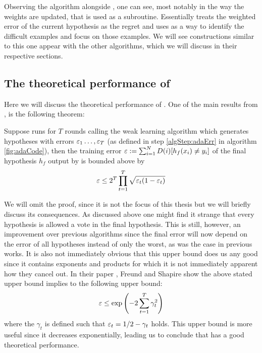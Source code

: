 Observing the \hedge\cite{Freund1997} algorithm alongside \adaB, one can see, most notably in the way the weights are updated, that \hedge is used as a subroutine. Essentially \adaB treats the weighted error of the current hypothesis as the regret and uses \hedge as a way to identify the difficult examples and focus \weak on those examples. We will see constructions similar to this one appear with the other algorithms, which we will discuss in their respective sections.
\subsection{The theoretical performance of \adaB}

\label{subsec:AdaTheoPerf}
Here we will discuss the theoretical performance of \adaB. One of the main results from \cite{Freund1997}, is the following theorem: 
\begin{theorem}\label{thm:adaErr}\cite{Freund1997}
Suppose \adaB runs for $T$ rounds calling the weak learning algorithm \weak which generates hypotheses with errors $\varepsilon_1\ldots, \varepsilon_T$ (as defined in step \ref{algStep:adaErr} in algorithm \ref{fig:adaCode}), then the training error $\varepsilon:=\sum_{i=1}^ND(i)[h_f(x_i)\neq y_i]$ of the final hypothesis $h_f$ output by \adaB is bounded above by $$\varepsilon\leq 2^T\prod^T_{t=1}\sqrt{\varepsilon_t(1-\varepsilon_t)}$$
\end{theorem}
We will omit the proof, since it is not the focus of this thesis but we will briefly discuss its consequences. As discussed above one might find it strange that every hypothesis is allowed a vote in the final hypothesis. This is still, however, an improvement over previous algorithms since the final error will now depend on the error of all hypotheses instead of only the worst, as was the case in previous works. It is also not immediately obvious that this upper bound does us any good since it contains exponents and products for which it is not immediately apparent how they cancel out. In their paper \cite{Freund1997}, Freund and Shapire show the above stated upper bound implies to the following upper bound: $$\varepsilon\leq \exp\left(-2\sum^T_{t=1}\gamma_t^2\right)$$ where the $\gamma_t$ is defined such that $\varepsilon_t=1/2-\gamma_t$ holds. This upper bound is more useful since it decreases exponentially, leading us to conclude that \adaB has a good theoretical performance.   


\section{\NHB}
\label{sec:NHB}

